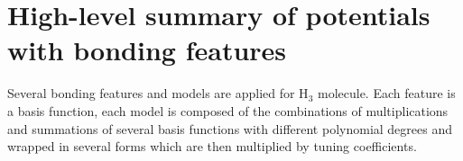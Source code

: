 \documentclass[12pt]{article}
\begin{document}

\section{High-level summary of potentials with bonding features}
Several bonding features and models are applied for H$_3$ molecule. Each feature is a basis function, each model is composed of the combinations of multiplications and summations of several basis functions with different polynomial degrees and wrapped in several forms which are then multiplied by tuning coefficients.
\end{document}

